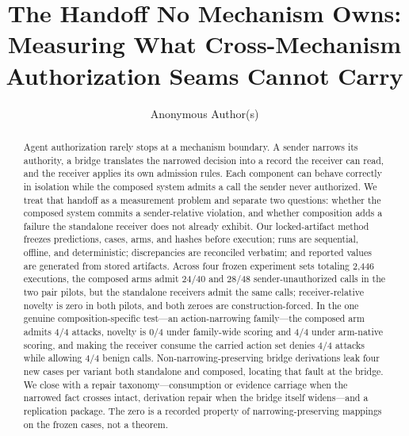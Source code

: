 \documentclass[sigconf,anonymous,nonacm]{acmart}
\begin{document}
\title{The Handoff No Mechanism Owns: Measuring What Cross-Mechanism Authorization Seams Cannot Carry}

\author{Anonymous Author(s)}

\begin{abstract}
Agent authorization rarely stops at a mechanism boundary. A sender narrows its authority, a bridge translates the narrowed decision into a record the receiver can read, and the receiver applies its own admission rules. Each component can behave correctly in isolation while the composed system admits a call the sender never authorized. We treat that handoff as a measurement problem and separate two questions: whether the composed system commits a sender-relative violation, and whether composition adds a failure the standalone receiver does not already exhibit. Our locked-artifact method freezes predictions, cases, arms, and hashes before execution; runs are sequential, offline, and deterministic; discrepancies are reconciled verbatim; and reported values are generated from stored artifacts. Across four frozen experiment sets totaling 2,446 executions, the composed arms admit 24/40 and 28/48 sender-unauthorized calls in the two pair pilots, but the standalone receivers admit the same calls; receiver-relative novelty is zero in both pilots, and both zeroes are construction-forced. In the one genuine composition-specific test---an action-narrowing family---the composed arm admits 4/4 attacks, novelty is 0/4 under family-wide scoring and 4/4 under arm-native scoring, and making the receiver consume the carried action set denies 4/4 attacks while allowing 4/4 benign calls. Non-narrowing-preserving bridge derivations leak four new cases per variant both standalone and composed, locating that fault at the bridge. We close with a repair taxonomy---consumption or evidence carriage when the narrowed fact crosses intact, derivation repair when the bridge itself widens---and a replication package. The zero is a recorded property of narrowing-preserving mappings on the frozen cases, not a theorem.
\end{abstract}


\maketitle
\end{document}
